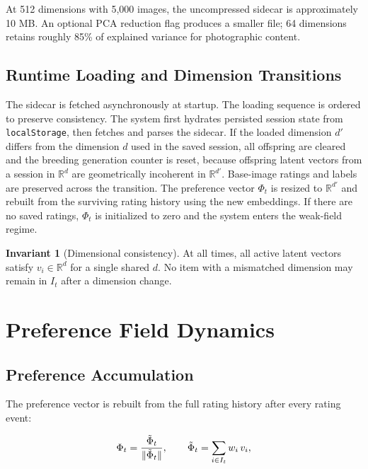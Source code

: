 \documentclass[12pt, a4paper]{article}
\DeclarePairedDelimiter{\norm}{\lVert}{\rVert}
\theoremstyle{definition}
\newtheorem{invariant}{Invariant}[section]
\begin{document}
At 512 dimensions with 5,000 images, the uncompressed sidecar is approximately 10 MB. An optional PCA reduction flag produces a smaller file; 64 dimensions retains roughly 85\% of explained variance for photographic content.

\subsection{Runtime Loading and Dimension Transitions}

The sidecar is fetched asynchronously at startup. The loading sequence is ordered to preserve consistency. The system first hydrates persisted session state from \texttt{localStorage}, then fetches and parses the sidecar. If the loaded dimension $d'$ differs from the dimension $d$ used in the saved session, all offspring are cleared and the breeding generation counter is reset, because offspring latent vectors from a session in $\mathbb{R}^d$ are geometrically incoherent in $\mathbb{R}^{d'}$. Base-image ratings and labels are preserved across the transition. The preference vector $\Phi_t$ is resized to $\mathbb{R}^{d'}$ and rebuilt from the surviving rating history using the new embeddings. If there are no saved ratings, $\Phi_t$ is initialized to zero and the system enters the weak-field regime.

\begin{invariant}[Dimensional consistency]
At all times, all active latent vectors satisfy $v_i \in \mathbb{R}^d$ for a single shared $d$. No item with a mismatched dimension may remain in $I_t$ after a dimension change.
\end{invariant}

\section{Preference Field Dynamics}
\label{sec:field-dynamics}

\subsection{Preference Accumulation}

The preference vector is rebuilt from the full rating history after every rating event:

\begin{equation}
\Phi_t = \frac{\tilde\Phi_t}{\norm{\tilde\Phi_t}}, \qquad \tilde\Phi_t = \sum_{i \in I_t} w_i\, v_i,
\end{equation}
\end{document}
